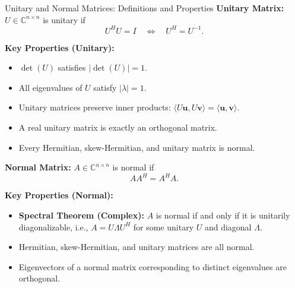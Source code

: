 \documentclass[12pt,a4paper]{article}
\begin{document}
\begin{infobox}{Unitary and Normal Matrices: Definitions and Properties}
\textbf{Unitary Matrix:} $U \in \mathbb{C}^{n\times n}$ is unitary if
\[
  U^H U = I \quad \Longleftrightarrow \quad U^H = U^{-1}.
\]

\textbf{Key Properties (Unitary):}
\begin{itemize}
  \item $\det(U)$ satisfies $|\det(U)| = 1$.
  \item All eigenvalues of $U$ satisfy $|\lambda| = 1$.
  \item Unitary matrices preserve inner products: $\langle U\mathbf{u}, U\mathbf{v}\rangle = \langle \mathbf{u}, \mathbf{v}\rangle$.
  \item A real unitary matrix is exactly an orthogonal matrix.
  \item Every Hermitian, skew-Hermitian, and unitary matrix is normal.
\end{itemize}

\textbf{Normal Matrix:} $A \in \mathbb{C}^{n\times n}$ is normal if
\[
  AA^H = A^H A.
\]

\textbf{Key Properties (Normal):}
\begin{itemize}
  \item \textbf{Spectral Theorem (Complex):} $A$ is normal if and only if it is unitarily diagonalizable, i.e., $A = U\Lambda U^H$ for some unitary $U$ and diagonal $\Lambda$.
  \item Hermitian, skew-Hermitian, and unitary matrices are all normal.
  \item Eigenvectors of a normal matrix corresponding to distinct eigenvalues are orthogonal.
\end{itemize}
\end{infobox}
\end{document}
